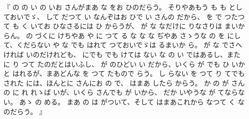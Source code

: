 『
の
の
い
の
いお
さんがまあ
な
をお
ひのだらう。
そりやあもう
も
も
としておいでゞ、
して
だつて
い
なんぞはお
ひで
い
さんの
だから、
を
で
つたつて
も
く
いてお
ひなさるには
ひ
からうが、
が
な
なだけに
りなさりは
まいか
らん。
の
づくに
けちやあ
や
に
つて
る
な
な
な
ぢやあ
さゝうな
の
を
にして、くだらない
や
な
でも
はれて
つておいでゞは
るまいか
ら。
が
な
でさへ
ければ
いのだけれども、
にでも
でも
けては
ない
な
の
い
ではあるし、また
に
り
つて
たのだとはいふし、
が
のひどい
い
だから、いくら
が
でも
ひ
いかと
はれるが、まあどんな
を
つて
たもので
らう。
し
らない
を
つて
り
てでもされた
には、ほんとに
さんにお
の
で、
はまあ
したら
からう。
か
の
が
さんの
に
れ
れゝば
いが、いくら
さんでも
が
いから、
だか
いやうな
が
てならない。
あゝ
の
める。
まあ
の
は
がついて、そして
はまあこれから
なつて
く
なのだらう。
』

